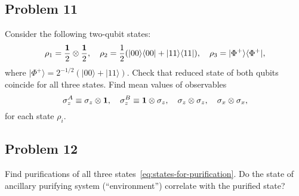 \documentclass[a4paper,10pt]{article}
\newcommand{\ket}[1]{|#1\rangle}
\newcommand{\bra}[1]{\langle#1|}
\begin{document}
\subsection*{Problem 11}
Consider the following two-qubit states:
\begin{equation} \label{eq:states-for-purification}
	\rho_1= \frac{{\bf 1}}{2}\otimes \frac{{\bf 1}}{2}, \quad \rho_{2}=\frac{1}{2}(\ket{00}\bra{00}+\ket{11}\bra{11}), \quad \rho_{3}=\ket{\Phi^{+}}\bra{\Phi^{+}},
\end{equation}
where $\ket{\Phi^{+}}=2^{-1/2}(\ket{00}+\ket{11})$.
Check that reduced state of both qubits coincide for all three states.
Find mean values of observables
\begin{equation}
	\sigma_{z}^{A}\equiv \sigma_{z}\otimes {\bf 1}, \quad \sigma_{z}^{B}\equiv {\bf 1}\otimes  \sigma_{z}, \quad \sigma_{z}\otimes\sigma_{z}, \quad \sigma_{x}\otimes\sigma_{x},
\end{equation}
for each state $\rho_{i}$.


\subsection*{Problem 12}
Find purifications of all three states~\eqref{eq:states-for-purification}.
Do the state of ancillary purifying system (``environment'') correlate with the purified state?
\end{document}

